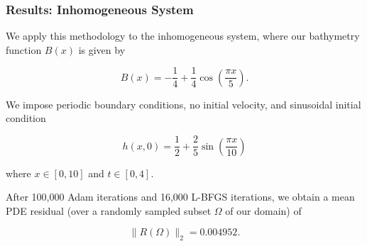 \begin{frame}
    \frametitle{Results: Inhomogeneous System}

    We apply this methodology to the inhomogeneous system, where our bathymetry function 
    $B(x)$ is given by

    $$
    B(x) = -\frac{1}{4} + \frac{1}{4} \cos{\left( \frac{\pi x}{5} \right)}.
    $$
   
    \pause
    We impose periodic boundary conditions, no initial velocity, and sinusoidal initial condition

    $$
    h(x, 0) = \frac{1}{2} + \frac{2}{5} \sin{\left( \frac{\pi x}{10} \right)}
    $$

    where $x \in [0, 10]$ and $t \in [0, 4]$.

    \medskip
    \pause

    After 100,000 Adam iterations and 16,000 L-BFGS iterations, we obtain a mean PDE residual (over a randomly sampled 
    subset $\Omega$ of our domain) of 
    
    $$
    \lVert R(\Omega) \rVert_2 = 0.004952.
    $$
\end{frame}